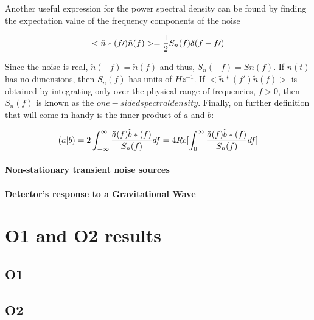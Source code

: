 \documentclass[binding=0.6cm, LaM]{sapthesis}
\begin{document}
	Another useful expression for the power spectral density can be found by finding 
	the expectation value of the frequency components of the noise

		\begin{equation}
		<\tilde{n}\ast(f\prime)\tilde{n}(f)>  = {1 \over 2} S_n(f) \delta (f-f\prime)
		\end{equation}

	Since the noise is real, $\tilde{n}(-f) = \tilde{n}(f)$ and thus, $S_n(−f) = Sn(f)$. 
	If $n(t)$ has no dimensions, then $S_n(f)$ has units of $Hz^{-1}$.
 	If $<\tilde{n}\ast(f\prime)\tilde{n}(f)> $ is obtained by integrating only over the physical
	range of frequencies, $f > 0$, then $S_n(f)$ is known as the $one-sided spectral density$.
	Finally, on further definition that will come in handy is the inner product of $a$ and $b$:


\begin{equation}
(a|b) = 2 \int^{\infty}_{-\infty} {{\tilde{a}(f)\tilde{b}\ast(f)} \over {S_n(f)}}df = 4 Re [\int^{\infty}_{0}{{\tilde{a}(f)\tilde{b}\ast(f)} \over {S_n(f)}} df]
\end{equation}


\subsubsection{Non-stationary transient noise sources}



\subsubsection{Detector’s response to a Gravitational Wave}



\chapter{O1 and O2 results}

\section{O1}

\section{O2}
\end{document}
